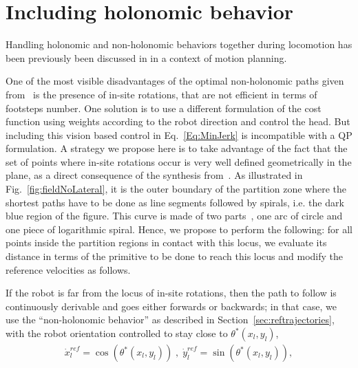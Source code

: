 



\section{Including holonomic behavior}
\label{sec:includingholonomic}

Handling holonomic and non-holonomic behaviors together during locomotion has been previously been discussed in \cite{MombaurHumanoids2008} in a context of motion planning.

One of the most visible disadvantages of the optimal non-holonomic paths given from~\cite{jib-IJHR2010} is the presence of in-site rotations, that are not efficient in terms of footsteps number.
One solution is to use a different formulation of the cost function using weights according to the robot direction and control the head.
But including this vision based control in Eq.~\ref{Eq:MinJerk} is incompatible with a QP formulation.
A strategy we propose here is to take advantage of the fact that the set of points where in-site rotations occur is very well defined geometrically in the plane, as a direct consequence of the synthesis from~\cite{Salaris:2010}. As illustrated in Fig.~\ref{fig:fieldNoLateral}, it is the outer boundary of the partition zone where the shortest paths have to be done as line segments followed by spirals, i.e. the dark blue region of the figure. This curve is made of two parts~\cite{Salaris:2010}, one arc of circle and one piece of logarithmic spiral. Hence, we propose to perform the following: for all points inside the partition regions in contact with this locus, we evaluate its distance in terms of the primitive to be done to reach this locus and modify the reference velocities as follows. 

If the robot is far from the locus of in-site rotations, then the path to follow is continuously derivable and goes either forwards or backwards; in that case, we use the ``non-holonomic behavior'' as described in Section~\ref{sec:reftrajectories}, with the robot orientation controlled to stay close to $\theta^*(x_l,y_l)$,
$$
\begin{array}{c}
\dot{x}^{ref}_l  =  \cos(\theta^*(x_l,y_l)) \;,\; \dot{y}^{ref}_l  =  \sin(\theta^*(x_l,y_l)), \\
\end{array}
$$

